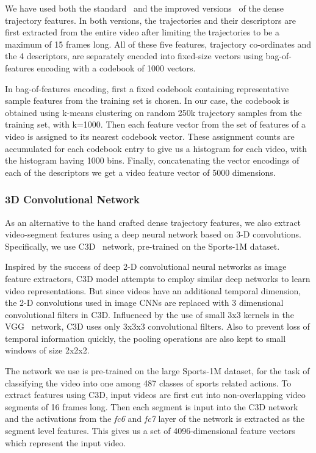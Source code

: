 We have used both the standard~\cite{DBLP:conf/cvpr/WangKSL11} and the improved
versions~\cite{Wang2013} of the dense trajectory features.
In both versions, the trajectories and their descriptors are first extracted
from the entire video after limiting the trajectories to be a maximum of 15
frames long.
All of these five features, trajectory co-ordinates and the 4 descriptors, are
separately encoded into fixed-size vectors using bag-of-features encoding with a
codebook of 1000 vectors.

In bag-of-features encoding, first a fixed codebook containing representative
sample features from the training set is chosen.
In our case, the codebook is obtained using k-means clustering on random 250k
trajectory samples from the training set, with k=1000.
Then each feature vector from the set of features of a video is assigned to its
nearest codebook vector.
These assignment counts are accumulated for each codebook entry to give us a
histogram for each video, with the histogram having 1000 bins.
Finally, concatenating the vector encodings of each of the descriptors we get a
video feature vector of 5000 dimensions. 

\subsubsection{3D Convolutional Network}
As an alternative to the hand crafted dense trajectory features, we also extract
video-segment features using a deep neural network based on 3-D
convolutions. 
Specifically, we use C3D~\cite{DBLP:C3D} network, pre-trained on the Sports-1M
dataset.

Inspired by the success of deep 2-D convolutional neural networks as image
feature extractors, C3D model attempts to employ similar deep networks to learn
video representations.
But since videos have an additional temporal dimension, the 2-D convolutions
used in image CNNs are replaced with 3 dimensional convolutional filters in C3D.
Influenced by the use of small 3x3 kernels in the VGG~\cite{Simonyan14c}
network, C3D uses only 3x3x3 convolutional filters.
Also to prevent loss of temporal information quickly, the pooling operations are
also kept to small windows of size 2x2x2.

The network we use is pre-trained on the large Sports-1M dataset, for the task
of classifying the video into one among 487 classes of sports related actions.
To extract features using C3D, input videos are first cut into non-overlapping
video segments of 16 frames long.
Then each segment is input into the C3D network and the activations from the
\emph{fc6} and \emph{fc7} layer of the network is extracted as the segment level
features.
This gives us a set of 4096-dimensional feature vectors which represent the
input video.

